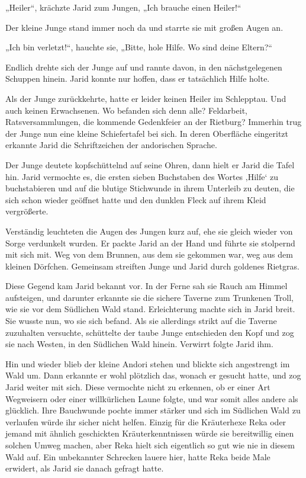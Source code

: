 „Heiler“, krächzte Jarid zum Jungen, „Ich brauche einen Heiler!“

Der kleine Junge stand immer noch da und starrte sie mit großen Augen an.

„Ich bin verletzt!“, hauchte sie, „Bitte, hole Hilfe. Wo sind deine Eltern?“

Endlich drehte sich der Junge auf und rannte davon, in den nächstgelegenen Schuppen hinein. Jarid konnte nur hoffen, dass er tatsächlich Hilfe holte.

Als der Junge zurückkehrte, hatte er leider keinen Heiler im Schlepptau. Und auch keinen Erwachsenen. Wo befanden sich denn alle? Feldarbeit, Ratsversammlungen, die kommende Gedenkfeier an der Rietburg? Immerhin trug der Junge nun eine kleine Schiefertafel bei sich. In deren Oberfläche eingeritzt erkannte Jarid die Schriftzeichen der andorischen Sprache.

Der Junge deutete kopfschüttelnd auf seine Ohren, dann hielt er Jarid die Tafel hin. Jarid vermochte es, die ersten sieben Buchstaben des Wortes ‚Hilfe‘ zu buchstabieren und auf die blutige Stichwunde in ihrem Unterleib zu deuten, die sich schon wieder geöffnet hatte und den dunklen Fleck auf ihrem Kleid vergrößerte.

Verständig leuchteten die Augen des Jungen kurz auf, ehe sie gleich wieder von Sorge verdunkelt wurden. Er packte Jarid an der Hand und führte sie stolpernd mit sich mit. Weg von dem Brunnen, aus dem sie gekommen war, weg aus dem kleinen Dörfchen. Gemeinsam streiften Junge und Jarid durch goldenes Rietgras.

Diese Gegend kam Jarid bekannt vor. In der Ferne sah sie Rauch am Himmel aufsteigen, und darunter erkannte sie die sichere Taverne zum Trunkenen Troll, wie sie vor dem Südlichen Wald stand. Erleichterung machte sich in Jarid breit. Sie wusste nun, wo sie sich befand. Als sie allerdings strikt auf die Taverne zuzuhalten versuchte, schüttelte der taube Junge entschieden den Kopf und zog sie nach Westen, in den Südlichen Wald hinein. Verwirrt folgte Jarid ihm.

Hin und wieder blieb der kleine Andori stehen und blickte sich angestrengt im Wald um. Dann erkannte er wohl plötzlich das, wonach er gesucht hatte, und zog Jarid weiter mit sich. Diese vermochte nicht zu erkennen, ob er einer Art Wegweisern oder einer willkürlichen Laune folgte, und war somit alles andere als glücklich. Ihre Bauchwunde pochte immer stärker und sich im Südlichen Wald zu verlaufen würde ihr sicher nicht helfen. Einzig für die Kräuterhexe Reka oder jemand mit ähnlich geschickten Kräuterkenntnissen würde sie bereitwillig einen solchen Umweg machen, aber Reka hielt sich eigentlich so gut wie nie in diesem Wald auf. Ein unbekannter Schrecken lauere hier, hatte Reka beide Male erwidert, als Jarid sie danach gefragt hatte.

